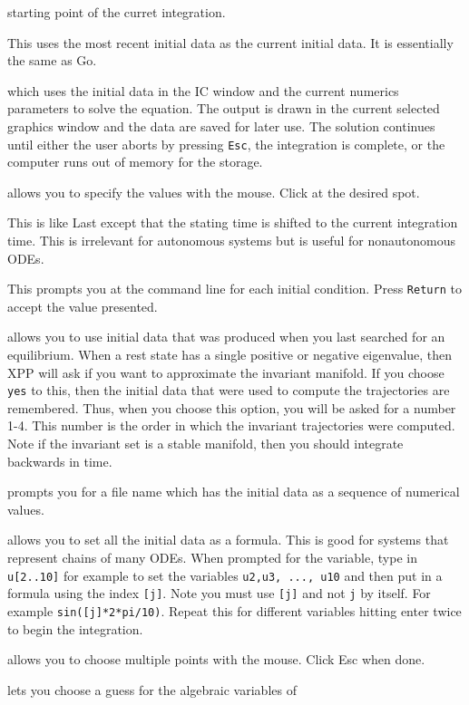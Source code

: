 \documentclass{article}
\begin{document}
\begin{description}
\begin{description}
 starting point of the curret integration.
\item[(O)ld] This uses the most recent initial data as the current initial 
data.  It is essentially the same as Go.
\item[(G)o] which uses the initial data in the IC window and the current
 numerics parameters to solve the equation.  The output is drawn in the
 current selected graphics window and the data are saved for later use.  The
 solution continues until either the user aborts by pressing {\tt Esc}, the
 integration is complete, or the computer runs out of memory for the storage.
\item[(M)ouse]  allows you to specify the values with the mouse.  Click at the
 desired spot.
\item[(S)hift] This is like Last except that the stating time is shifted to the 
current integration time.  This is irrelevant for autonomous systems but is
 useful for nonautonomous ODEs.
\item[(N)ew] This prompts you at the command line for each initial condition.
 Press {\tt Return} to accept the value presented.
\item[s(H)oot] allows you to use initial data that was produced when
you last searched for an equilibrium.  When a rest state has a single
positive or negative eigenvalue, then XPP will ask if you want to
approximate the invariant manifold.  If you choose {\tt yes} to this,
then the initial data that were used to compute the trajectories are
remembered.  Thus, when you choose this option, you will be asked for
a number 1-4.  This number is the order in which the invariant
trajectories were computed.  Note if the invariant set is a stable
manifold, then you should integrate backwards in time.
\item[(F)ile] prompts you for a file name which has the initial data
as a sequence of numerical values.
\item[form(U)la] allows you to set all the initial data as a
formula. This is good for systems that represent chains of many ODEs.
When prompted for the variable, type in {\tt u[2..10]} for example to
set the variables {\tt u2,u3, ..., u10} and then put in a formula
using the index {\tt [j]}. Note you must use {\tt [j]} and not {\tt j}
by itself. For example {\tt sin([j]*2*pi/10)}. Repeat this for
different variables hitting enter twice to begin the integration.
\item[M(I)ce] allows you to choose multiple points with the
mouse. Click Esc when done.
\item[(D)AE guess] lets you choose a guess for the algebraic variables of

\end{description}
\end{description}
\end{document}
